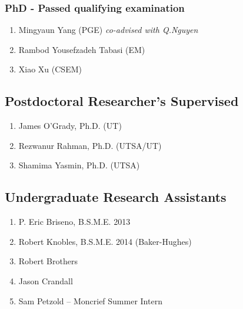 \subsubsection*{PhD - Passed qualifying examination}
\begin{enumerate}
    \item Mingyaun Yang (PGE) \emph{co-advised with Q.Nguyen}
    \item Rambod Yousefzadeh Tabasi (EM)
    \item Xiao Xu (CSEM)
\end{enumerate}



\subsection*{Postdoctoral Researcher's Supervised}
  \begin{enumerate}
      \item James O'Grady, Ph.D. (UT)
      \item Rezwanur Rahman, Ph.D. (UTSA/UT)
      \item Shamima Yasmin, Ph.D. (UTSA)
  \end{enumerate}

\subsection*{Undergraduate Research Assistants}
  \begin{enumerate}
    \item P. Eric Briseno, B.S.M.E. 2013
    \item Robert Knobles, B.S.M.E. 2014 (Baker-Hughes)
    \item Robert Brothers
    \item Jason Crandall
    \item Sam Petzold -- Moncrief Summer Intern
  \end{enumerate}

